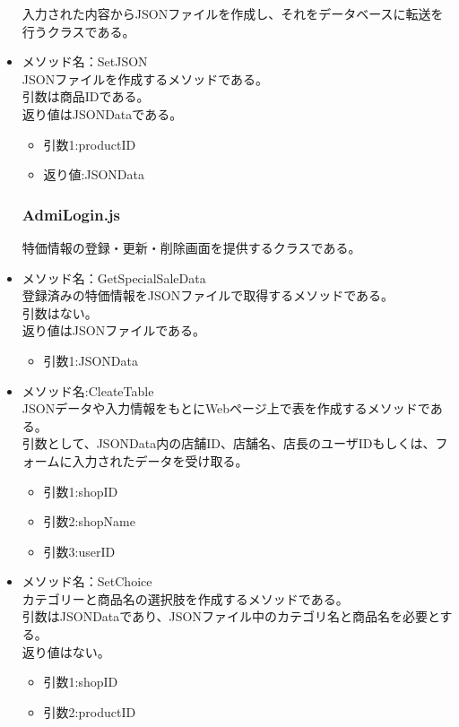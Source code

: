 \documentclass[a4j]{jarticle}
\begin{document}
\begin{itemize}
入力された内容からJSONファイルを作成し、それをデータベースに転送を行うクラスである。\\

\item メソッド名：SetJSON\\

JSONファイルを作成するメソッドである。\\
引数は商品IDである。\\
返り値はJSONDataである。
	\begin{itemize}
		\item 引数1:productID
		\item 返り値:JSONData
	\end{itemize}
\subsubsection{AdmiLogin.js}

特価情報の登録・更新・削除画面を提供するクラスである。
%
\item メソッド名：GetSpecialSaleData\\

登録済みの特価情報をJSONファイルで取得するメソッドである。\\
引数はない。\\
返り値はJSONファイルである。


	\begin{itemize}
		\item 引数1:JSONData
	\end{itemize}
	\item メソッド名:CleateTable\\
	
JSONデータや入力情報をもとにWebページ上で表を作成するメソッドである。\\
引数として、JSONData内の店舗ID、店舗名、店長のユーザIDもしくは、フォームに入力されたデータを受け取る。
	\begin{itemize}	
		\item 引数1:shopID
		\item 引数2:shopName
		\item 引数3:userID
	\end{itemize}
\item メソッド名：SetChoice\\

カテゴリーと商品名の選択肢を作成するメソッドである。\\
引数はJSONDataであり、JSONファイル中のカテゴリ名と商品名を必要とする。\\
返り値はない。
	\begin{itemize}
		\item 引数1:shopID
		\item 引数2:productID
	\end{itemize}
			

\end{itemize}
\end{document}
